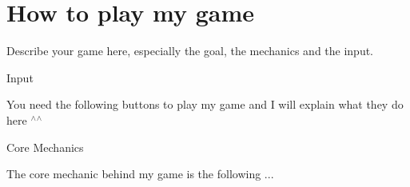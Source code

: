 \chapter{How to play my game}
\hypertarget{md__c_1_2repositories_2uni_227-gl3-odonnell_2code_2docs_2wiki_2game}{}\label{md__c_1_2repositories_2uni_227-gl3-odonnell_2code_2docs_2wiki_2game}
\label{md__c_1_2repositories_2uni_227-gl3-odonnell_2code_2docs_2wiki_2game_autotoc_md2}%
%
 Describe your game here, especially the goal, the mechanics and the input.


\begin{DoxyEnumerate}
\item Input
\end{DoxyEnumerate}
\begin{DoxyItemize}
\item You need the following buttons to play my game and I will explain what they do here \texorpdfstring{$^\wedge$}{\string^}\texorpdfstring{$^\wedge$}{\string^}
\end{DoxyItemize}
\begin{DoxyEnumerate}
\item Core Mechanics
\end{DoxyEnumerate}
\begin{DoxyItemize}
\item The core mechanic behind my game is the following ... 
\end{DoxyItemize}